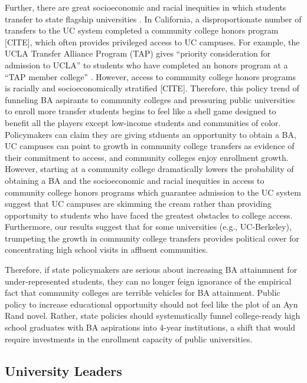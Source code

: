 \documentclass[twoside]{article}
\begin{document}
Further, there are great socioeconomic and racial inequities in which students transfer to state flagship universities \citep{RN1492,RN4406}. In California, a disproportionate number of transfers to the UC system completed a community college honors program [CITE], which often provides privileged access to UC campuses. For example, the UCLA Transfer Alliance Program (TAP) gives ``priority consideration for admission to UCLA'' to students who have completed an honors program at a ``TAP member college'' \citep{RN4432}. However, access to community college honors programs is racially and socioeconomically stratified [CITE].  Therefore, this policy trend of funneling BA aspirants to community colleges and pressuring public universities to enroll more transfer students begins to feel like a shell game designed to benefit all the players except low-income students and communities of color. Policymakers can claim they are giving stduents an opportunity to obtain a BA, UC campuses can point to growth in community college transfers as evidence of their commitment to access, and community colleges enjoy enrollment growth. However, starting at a community college dramatically lowers the probability of obtaining a BA and the socioeconomic and racial inequities in access to community college honors programs which guarantee admission to the UC system suggest that UC campuses are skimming the cream rather than providing opportunity to students who have faced the greatest obstacles to college access.  Furthermore, our results suggest that for some universities (e.g., UC-Berkeley), trumpeting the growth in community college transfers provides political cover for concentrating high school visits in affluent communities.  

Therefore, if state policymakers are serious about increasing BA attainmnent for under-represented students, they can no longer feign ignorance of the empirical fact that community colleges are terrible vehicles for BA attainment. Public policy to increase educational opportunity should not feel like the plot of an Ayn Rand novel. Rather, state policies should systematically funnel college-ready high school graduates with BA aspirations into 4-year institutions, a shift that would require investments in the enrollment capacity of public universities.

\subsection*{University Leaders}
\end{document}
